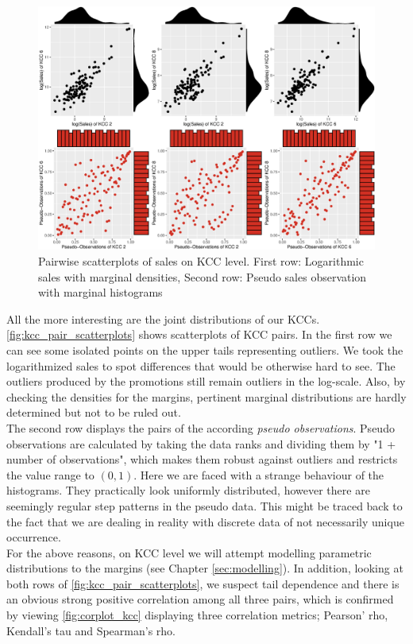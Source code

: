 \begin{figure}[H]
\centering
  \includegraphics[width=0.95\linewidth]{figures/kcc_pair_scatterplots.eps}
  \caption{Pairwise scatterplots of sales on \ac{KCC} level. First row: Logarithmic sales with marginal densities, Second row: Pseudo sales observation with marginal histograms}
  \label{fig:kcc_pair_scatterplots}
\end{figure}


All the more interesting are the joint distributions of our \acp{KCC}. \autoref{fig:kcc_pair_scatterplots} shows scatterplots of \ac{KCC} pairs. In the first row we can see some isolated points on the upper tails representing outliers. We took the logarithmized sales to spot differences that would be otherwise hard to see. The outliers produced by the promotions still remain outliers in the log-scale. Also, by checking the densities for the margins, pertinent marginal distributions are hardly determined but not to be ruled out.\\
The second row displays the pairs of the according \textit{pseudo observations}. Pseudo observations are calculated by taking the data ranks and dividing them by "1 + number of observations", which makes them robust against outliers and restricts the value range to $(0, 1)$. Here we are faced with a strange behaviour of the histograms. They practically look uniformly distributed, however there are seemingly regular step patterns in the pseudo data. This might be traced back to the fact that we are dealing in reality with discrete data of not necessarily unique occurrence.\\

For the above reasons, on \ac{KCC} level we will attempt modelling parametric distributions to the margins (see Chapter \ref{sec:modelling}). 
In addition, looking at both rows of \autoref{fig:kcc_pair_scatterplots}, we suspect tail dependence and there is an obvious strong positive correlation among all three pairs, which is confirmed by viewing \autoref{fig:corplot_kcc} displaying three correlation metrics; Pearson' rho, Kendall's tau and Spearman's rho.
 \\


